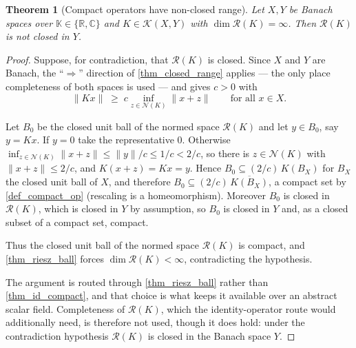 \documentclass[a4paper]{report}
\theoremstyle{plain}
\newtheorem{theorem}{Theorem}[chapter]
\theoremstyle{definition}
\theoremstyle{remark}
\begin{document}
\begin{theorem}[Compact operators have non-closed range]
  \label{thm_compact_range_not_closed}
  Let $X,Y$ be Banach spaces over $\mathbb{K} \in \{\mathbb{R},\mathbb{C}\}$ and
  $K \in \mathcal{K}(X,Y)$ with $\dim\mathcal{R}(K) = \infty$.  Then $\mathcal{R}(K)$ is
  not closed in $Y$.
\end{theorem}
\begin{proof}
  Suppose, for contradiction, that $\mathcal{R}(K)$ is closed.  Since $X$ and $Y$ are
  Banach, the ``$\Rightarrow$'' direction of \cref{thm_closed_range} applies --- the only
  place completeness of both spaces is used --- and gives $c > 0$ with
  \[
    \|Kx\| \;\ge\; c \inf_{z \in \mathcal{N}(K)}\|x+z\| \qquad \text{for all } x \in X .
  \]

  Let $B_0$ be the closed unit ball of the normed space $\mathcal{R}(K)$ and let
  $y \in B_0$, say $y = Kx$.  If $y = 0$ take the representative $0$.  Otherwise
  $\inf_{z \in \mathcal{N}(K)}\|x+z\| \le \|y\|/c \le 1/c < 2/c$, so there is
  $z \in \mathcal{N}(K)$ with $\|x+z\| \le 2/c$, and $K(x+z) = Kx = y$.  Hence
  $B_0 \subseteq (2/c)\,K(B_X)$ for $B_X$ the closed unit ball of $X$, and therefore
  $B_0 \subseteq (2/c)\,\overline{K(B_X)}$, a compact set by \cref{def_compact_op}
  (rescaling is a homeomorphism).  Moreover $B_0$ is closed in $\mathcal{R}(K)$, which is
  closed in $Y$ by assumption, so $B_0$ is closed in $Y$ and, as a closed subset of a
  compact set, compact.

  Thus the closed unit ball of the normed space $\mathcal{R}(K)$ is compact, and
  \cref{thm_riesz_ball} forces $\dim\mathcal{R}(K) < \infty$, contradicting the
  hypothesis.

  The argument is routed through \cref{thm_riesz_ball} rather than \cref{thm_id_compact},
  and that choice is what keeps it available over an abstract
  scalar field.  Completeness of $\mathcal{R}(K)$, which the identity-operator
  route would additionally need, is therefore not used, though it does hold: under the
  contradiction hypothesis $\mathcal{R}(K)$ is closed in the Banach space $Y$.
\end{proof}
\end{document}
